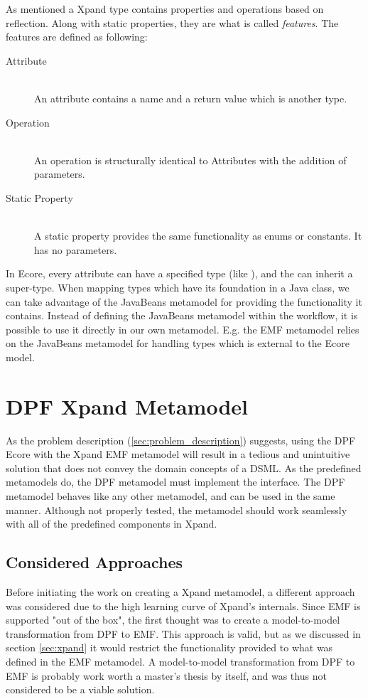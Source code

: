 As mentioned a Xpand type contains properties and operations based on reflection. Along with static properties, they are what is called \emph{features}. 
\newpage
The features are defined as following:
\begin{description}
  \item[Attribute] \hfill \\
  An attribute contains a name and a return value which is another type.
  \item[Operation] \hfill \\
  An operation is structurally identical to Attributes with the addition of parameters.
  \item[Static Property] \hfill \\
  A static property provides the same functionality as enums or constants. It has no parameters.
\end{description}

In Ecore, every attribute can have a specified type (like ), and the  can inherit a super-type. When mapping types which have its foundation in a Java class, we can take advantage of the JavaBeans metamodel for providing the functionality it contains. Instead of defining the JavaBeans metamodel within the workflow, it is possible to use it directly in our own metamodel. E.g. the EMF metamodel relies on the JavaBeans metamodel for handling types which is external to the Ecore model.

\section{DPF Xpand Metamodel}
As the problem description (\ref{sec:problem_description}) suggests, using the DPF Ecore with the Xpand EMF metamodel will result in a tedious and unintuitive solution that does not convey the domain concepts of a DSML. As the predefined metamodels do, the DPF metamodel must implement the  interface. The DPF metamodel behaves like any other metamodel, and can be used in the same manner. Although not properly tested, the metamodel should work seamlessly with all of the predefined components in Xpand.

\subsection{Considered Approaches}\label{subsec:considered_approaches}
Before initiating the work on creating a Xpand metamodel, a different approach was considered due to the high learning curve of Xpand's internals. Since EMF is supported "out of the box", the first thought was to create a model-to-model transformation from DPF to EMF. This approach is valid, but as we discussed in section \ref{sec:xpand} it would restrict the functionality provided to what was defined in the EMF metamodel. A model-to-model transformation from DPF to EMF is probably work worth a master's thesis by itself, and was thus not considered to be a viable solution. 

